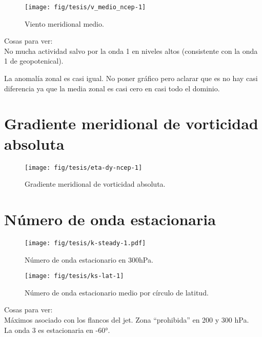 \documentclass[spanish,a4paper]{book}
\begin{document}
\begin{figure}

{\centering \texttt{[image: fig/tesis/v\_medio\_ncep-1]} 

}

\caption{Viento meridional medio.}\label{fig:v_medio_ncep}
\end{figure}

Cosas para ver:\\
No mucha actividad salvo por la onda 1 en niveles altos (consistente con
la onda 1 de geopotenical).

La anomalía zonal es casi igual. No poner gráfico pero aclarar que es no
hay casi diferencia ya que la media zonal es casi cero en casi todo el
dominio.

\section{Gradiente meridional de vorticidad
absoluta}\label{gradiente-meridional-de-vorticidad-absoluta}

\begin{figure}

{\centering \texttt{[image: fig/tesis/eta-dy-ncep-1]} 

}

\caption{Gradiente meridional de vorticidad absoluta.}\label{fig:eta-dy-ncep}
\end{figure}

\section{Número de onda estacionaria}\label{numero-de-onda-estacionaria}

\begin{figure}
\centering
\texttt{[image: fig/tesis/k-steady-1.pdf]}
\caption{Número de onda estacionario en 300hPa.}
\end{figure}

\begin{figure}

{\centering \texttt{[image: fig/tesis/ks-lat-1]} 

}

\caption{Número de onda estacionario medio por círculo de latitud.}\label{fig:ks-lat}
\end{figure}

Cosas para ver:\\
Máximos asociado con los flancos del jet. Zona ``prohibida'' en 200 y
300 hPa.\\
La onda 3 es estacionaria en -60°.
\end{document}
